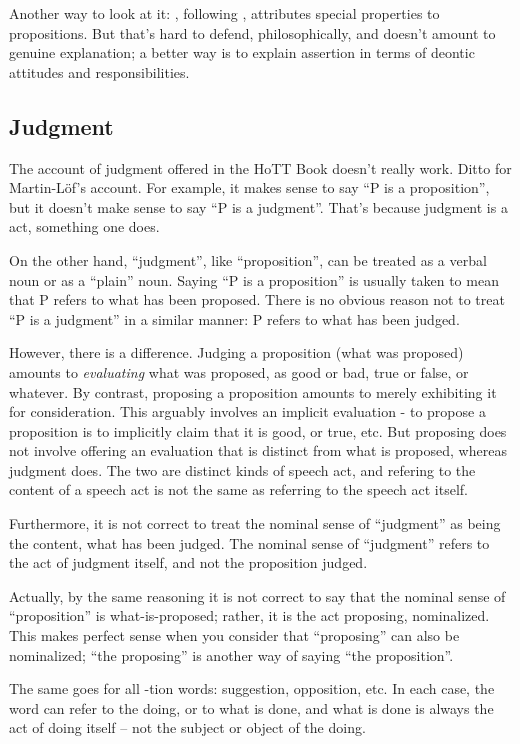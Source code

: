 Another way to look at it: \HoTT, following \ML{}, attributes
special properties to propositions.  But that's hard to defend,
philosophically, and doesn't amount to genuine explanation; a better
way is to explain assertion in terms of deontic attitudes and
responsibilities.

\subsection{Judgment}
\label{subs:judgment}


The account of judgment offered in the HoTT Book doesn't really work.
Ditto for Martin-L\"{o}f's account.  For example, it makes sense to
say ``P is a proposition'', but it doesn't make sense to say ``P is a
judgment''.  That's because judgment is a act, something one does.

On the other hand, ``judgment'', like ``proposition'', can be treated
as a verbal noun or as a ``plain'' noun.  Saying ``P is a
proposition'' is usually taken to mean that P refers to what has been
proposed.  There is no obvious reason not to treat ``P is a judgment''
in a similar manner: P refers to what has been judged.

However, there is a difference.  Judging a proposition (what was
proposed) amounts to \textit{evaluating} what was proposed, as good or
bad, true or false, or whatever.  By contrast, proposing a proposition
amounts to merely exhibiting it for consideration.  This arguably
involves an implicit evaluation - to propose a proposition is to
implicitly claim that it is good, or true, etc.  But proposing does
not involve offering an evaluation that is distinct from what is
proposed, whereas judgment does.  The two are distinct kinds of speech
act, and refering to the content of a speech act is not the same as
referring to the speech act itself.

Furthermore, it is not correct to treat the nominal sense of
``judgment'' as being the content, what has been judged.  The nominal
sense of ``judgment'' refers to the act of judgment itself, and not
the proposition judged.

Actually, by the same reasoning it is not correct to say that the
nominal sense of ``proposition'' is what-is-proposed; rather, it is
the act proposing, nominalized.  This makes perfect sense when you
consider that ``proposing'' can also be nominalized; ``the proposing''
is another way of saying ``the proposition''.

The same goes for all -tion words: suggestion, opposition, etc.  In
each case, the word can refer to the doing, or to what is done, and
what is done is always the act of doing itself -- not the subject or
object of the doing.

